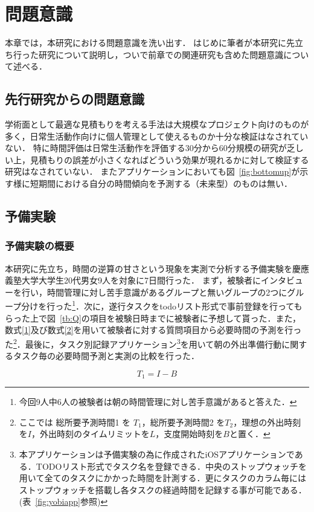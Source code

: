 \chapter{問題意識}
本章では，本研究における問題意識を洗い出す．
はじめに筆者が本研究に先立ち行った研究について説明し，ついで前章での関連研究も含めた問題意識について述べる．

\section{先行研究からの問題意識}
学術面として最適な見積もりを考える手法は大規模なプロジェクト向けのものが多く，日常生活動作向けに個人管理として使えるものか十分な検証はなされていない．
特に時間評価は日常生活動作を評価する30分から60分規模の研究が乏しい上，見積もりの誤差が小さくなればどういう効果が現れるかに対して検証する研究はなされていない．
またアプリケーションにおいても図~\ref{fig:bottomup}が示す様に短期間における自分の時間傾向を予測する（未来型）のものは無い．

\section{予備実験}
\subsection{予備実験の概要}
本研究に先立ち，時間の逆算の甘さという現象を実測で分析する予備実験を慶應義塾大学大学生20代男女9人を対象に7日間行った．
まず，被験者にインタビューを行い，時間管理に対し苦手意識があるグループと無いグループの2つにグループ分けを行った\footnote{今回9人中6人の被験者は朝の時間管理に対し苦手意識があると答えた．}．次に，遂行タスクをtodoリスト形式で事前登録を行ってもらった上で図~\ref{tb:Q}の項目を被験日時までに被験者に予想して貰った．また，数式\ref{1}及び数式\ref{2}を用いて被験者に対する質問項目から必要時間の予測を行った\footnote{ここでは 総所要予測時間1 を $T_{1}$，総所要予測時間2 を$T_{2}$，理想の外出時刻を$I$，外出時刻のタイムリミットを$L$，支度開始時刻を$B$と置く．}．最後に，タスク別記録アプリケーション\footnote{本アプリケーションは予備実験の為に作成されたiOSアプリケーションである．TODOリスト形式でタスク名を登録できる．中央のストップウォッチを用いて全てのタスクにかかった時間を計測する．更にタスクのカラム毎にはストップウォッチを搭載し各タスクの経過時間を記録する事が可能である．(表~\ref{fig:yobiapp}参照)}を用いて朝の外出準備行動に関するタスク毎の必要時間予測と実測の比較を行った．

\begin{equation}
\label{1}
 T_{1} = I - B 
\end{equation}


